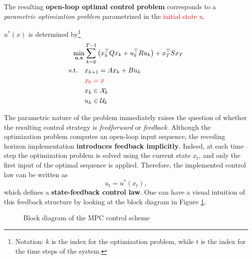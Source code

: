 The resulting \textbf{open-loop optimal control problem} corresponds to a \textit{parametric
optimization problem} parametrized in the \textcolor{red}{initial state x}.
\begin{theorembox}
$u^*(x)$ is determined by\footnote{Notation: $k$ is the index for the optimization problem, while $t$ is the index for the time steps of the system.}
\begin{align*}
    \min_{\mathbf{u},\mathbf{x}} &\sum_{k=0}^{T-1} \left( x_k^\top Q x_k + u_k^\top R u_k \right) + x_T^\top S x_T\\
    \text{s.t.} \quad & x_{k+1} = A x_k + B u_k\\
    & \textcolor{red}{x_0 = x} \\
    & x_k \in \mathcal{X}_k \\
    & u_k \in \mathcal{U}_k
\end{align*}
\end{theorembox}

The parametric nature of the problem immediately raises the question of whether the resulting control strategy is \emph{feedforward} or \emph{feedback}. Although the optimization problem computes an open-loop input sequence, the receding horizon implementation \textbf{introduces feedback implicitly}. Indeed, at each time step the optimization problem is solved using the current state $x_t$, and only the first input of the optimal sequence is applied. Therefore, the implemented control law can be written as
\[
u_t = u^*(x_t),
\]
which defines a \textbf{state-feedback control law}. One can have a visual intuition of this feedback structure by looking at the block diagram in Figure \ref{fig:mpc_05}.
\begin{figure}[!ht]
\centering

\caption{Block diagram of the MPC control scheme}
\label{fig:mpc_05}
\end{figure}

